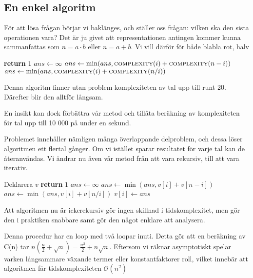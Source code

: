 \documentclass[a4paper,titlepage,draft]{article}
\begin{document}
\subsection{En enkel algoritm}

För att lösa frågan börjar vi baklänges, och ställer oss frågan: vilken ska den sista operationen vara?
Det är ju givet att representationen antingen kommer kunna sammanfattas som $n = a\cdot b$ eller $n = a+b$.
Vi vill därför för både
blabla rot, halv

\begin{algorithmic}[1]
\State \textbf{return} $1$
\EndIf
\State  $ans\gets \infty$
\State $ans\gets \min(ans, \textsc{complexity}(i)+\textsc{complexity}(n-i))$
\EndFor
{}
\State $ans\gets \min(ans, \textsc{complexity}(i)+\textsc{complexity}(n/i))$
\EndIf
\EndFor

\EndProcedure
\end{algorithmic}

Denna algoritm finner utan problem komplexiteten av tal upp till runt 20. Därefter blir den alltför långsam.

En insikt kan dock förbättra vår metod och tillåta beräkning av komplexiteten för tal upp till 10 000 på under en sekund.

Problemet innehåller nämligen många överlappande delproblem, och dessa löser algoritmen ett flertal gånger. Om vi istället sparar resultatet för varje
tal kan de återanvändas. Vi ändrar nu även vår metod från att vara rekursiv, till att vara iterativ.


\begin{algorithmic}[1]
\State Deklarera $v$
\State \textbf{return} $1$
\State  $ans\gets \infty$
\State $ans\gets \min(ans, v[i]+ v[n-i])$
\EndFor
{}
\State $ans\gets \min(ans, v[i]+v[n/i])$
\EndIf
\EndFor
\State $v[i] \gets ans$
\EndFor
\EndProcedure
\end{algorithmic}


Att algoritmen nu är ickerekursiv gör ingen skillnad i tidskomplexitet, men gör den i praktiken snabbare samt gör den något enklare att analysera.

Denna procedur har en loop med två loopar inuti. Detta gör att en beräkning av C(n) tar $n\left(\frac{n}{2}+\sqrt n\right) = \frac{n^2}{2} + n\sqrt n$. Eftersom vi räknar asymptotiskt spelar varken långsammare växande termer eller konstantfaktorer roll,  vilket innebär att algoritmen får tidskomplexiteten $\mathcal{O}(n^2)$

{}

\end{document}

